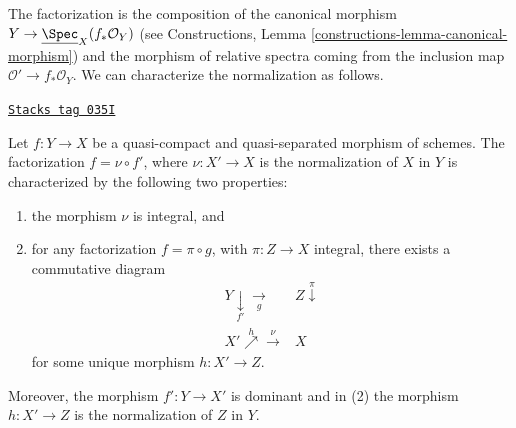 The factorization is the composition of the canonical morphism
$Y \to \underline{\Spec}_X(f_*\mathcal{O}_Y)$ (see
Constructions, Lemma
\ref{constructions-lemma-canonical-morphism})
and the morphism of relative spectra coming from the inclusion map
$\mathcal{O}' \to f_*\mathcal{O}_Y$. We can characterize the
normalization as follows.

\begin{lemma}
\label{morphisms-lemma-characterize-normalization}
\href{https://stacks.math.columbia.edu/tag/035I}{\texttt{Stacks tag 035I}}

Let $f : Y \to X$ be a quasi-compact and quasi-separated morphism of schemes.
The factorization $f = \nu \circ f'$, where $\nu : X' \to X$ is the
normalization of $X$ in $Y$ is characterized by the following
two properties:
\begin{enumerate}
\item the morphism $\nu$ is integral, and
\item for any factorization $f = \pi \circ g$, with $\pi : Z \to X$
integral, there exists a commutative diagram
$$
\begin{array}{cc}Y \underset{f'}{\downarrow}\underset{g}{\longrightarrow} & Z \overset{\pi}{\downarrow} \\ X' \overset{h}{\nearrow}\overset{\nu}{\longrightarrow} & X\end{array}
$$
for some unique morphism $h : X' \to Z$.
\end{enumerate}
Moreover, the morphism $f' : Y \to X'$ is dominant and in (2) the
morphism $h : X' \to Z$ is the normalization of $Z$ in $Y$.
\end{lemma}

